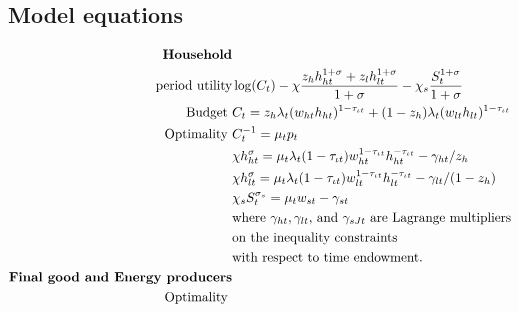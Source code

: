 \subsection{Model equations}
\vspace{-2mm}
\begin{align}
\text{\textbf{Household}}&\nonumber\\ \text{period utility}\vspace{4mm}&  \log(C_t)-\chi\frac{z_hh_{ht}^{1+\sigma}+z_lh_{lt}^{1+\sigma}}{1+\sigma}-\chi_s\frac{S_t^{1+\sigma}}{{1+\sigma}} \nonumber %
\\
\text{Budget}\ \vspace{4mm}& C_t=z_h \lambda_t (w_{ht}h_{ht})^{1-\tau_{\iota t}}+(1-z_h) \lambda_t (w_{lt}h_{lt})^{1-\tau_{\iota t}}\nonumber\\ %
\text{Optimality}\ \vspace{4mm}
& C_t^{-1}= \mu_tp_{t}\nonumber\\
& \chi h_{ht}^{\sigma}=\mu_t \lambda_t(1-\tau_{\iota t})w_{ht}^{1-\tau_{\iota t}}h_{ht}^{-\tau_{\iota t}}-\gamma_{ht}/z_h\nonumber\\
& \chi h_{lt}^{\sigma}=\mu_t \lambda_t(1-\tau_{\iota t})w_{lt}^{1-\tau_{\iota t}}h_{lt}^{-\tau_{\iota t}}-\gamma_{lt}/(1-z_h)\nonumber\\
& \chi_s S_{t}^{\sigma_s} =\mu_t w_{st}-\gamma_{st} \nonumber\\ %
& \text{where $\gamma_{ht}, \gamma_{lt}$, and $\gamma_{sJt}$ are Lagrange multipliers}\nonumber \\ 
& \text{on the inequality constraints}\nonumber \\ 
& \text{with respect to time endowment.}\nonumber\\
\text{\textbf{Final good and Energy producers}}&\nonumber\\
\text{Optimality}\ \vspace{4mm}&

\end{align}

